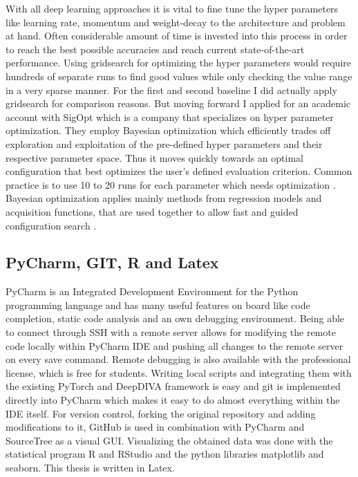 With all deep learning approaches it is vital to fine tune the hyper parameters like learning rate, momentum and weight-decay to the architecture and problem at hand. Often considerable amount of time is invested into this process in order to reach the best possible accuracies and reach current state-of-the-art performance. Using gridsearch for optimizing the hyper parameters would require hundreds of separate runs to find good values while only checking the value range in a very sparse manner. For the first and second baseline I did actually apply gridsearch for comparison reasons. But moving forward I applied for an academic account with SigOpt \cite{sigopt} which is a company that specializes on hyper parameter optimization. They employ Bayesian optimization which efficiently trades off exploration and exploitation of the pre-defined hyper parameters and their respective parameter space. Thus it moves quickly towards an optimal configuration that best optimizes the user's defined evaluation criterion. Common practice is to use 10 to 20 runs for each parameter which needs optimization \cite{sigoptObservationBudget}. Bayesian optimization applies mainly methods from regression models and acquisition functions, that are used together to allow fast and guided configuration search \cite{sigoptBayesian}.

\subsection{PyCharm, GIT, R and Latex}

PyCharm \cite{PyCharm} is an Integrated Development Environment for the Python programming language and has many useful features on board like code completion, static code analysis and an own debugging environment. Being able to connect through SSH with a remote server allows for modifying the remote code locally within PyCharm IDE and pushing all changes to the remote server on every save command. Remote debugging is also available with the professional license, which is free for students. Writing local scripts and integrating them with the existing PyTorch and DeepDIVA framework is easy and git is implemented directly into PyCharm which makes it easy to do almost everything within the IDE itself.
For version control, forking the original repository and adding modifications to it, GitHub \cite{GitHub} is used in combination with PyCharm and SourceTree \cite{SourceTree} as a visual GUI.
Visualizing the obtained data was done with the statistical program R \cite{statR} and RStudio \cite{rstudio} and the python libraries matplotlib and seaborn. This thesis is written in Latex.

